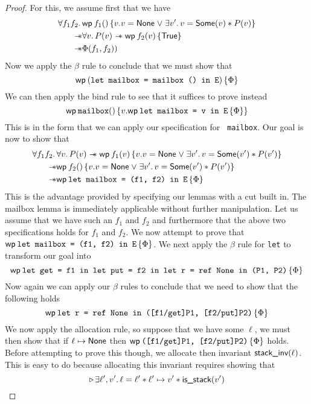 \begin{proof}
  For this, we assume first that we have
  \begin{align*}
    \All f_1 f_2.&
        \wpre{f_1()}{v. v = \textlog{None} \mathrel{\vee} \Exists v'. v = \textlog{Some}(v) * P(v)}\\
    \wand & \All v. P(v) \wand \wpre{f_2(v)}{\TRUE}\\
    \wand & \Phi(f_1, f_2))\\
  \end{align*}
  Now we apply the $\beta$ rule to conclude that we must show that
  \[
    \wpre{(\text{\tt let mailbox = mailbox () in E})}{\Phi}
  \]
  We can then apply the bind rule to see that it suffices to prove
  instead
  \[
    \wpre{\mathtt{mailbox()}}{v. \wpre{\text{\tt let mailbox = v in E}}{\Phi}}
  \]
  This is in the form that we can apply our specification for {\tt
    mailbox}. Our goal is now to show that
  \begin{align*}
    \All f_1 f_2.&
    \All v. P(v) \wand \wpre{f_1(v)}{v. v = \textlog{None} \mathrel{\vee} \Exists v'. v = \textlog{Some}(v') * P(v')}\\
    \wand & \wpre{f_2()}{v. v = \textlog{None} \mathrel{\vee} \Exists v'. v = \textlog{Some}(v') * P(v')}\\
    \wand & \wpre{\text{\tt let mailbox = (f1, f2) in E}}{\Phi}
  \end{align*}
  This is the advantage provided by specifying our lemmas with a cut
  built in. The mailbox lemma is immediately applicable without
  further manipulation. Let us assume that we have such an $f_1$ and
  $f_2$ and furthermore that the above two specifications holds for
  $f_1$ and $f_2$. We now attempt to prove that
  $\wpre{\text{\tt let mailbox = (f1, f2) in E}}{\Phi}$.  We next
  apply the $\beta$ rule for {\tt let} to transform our goal into
  \[
    \wpre{\text{\tt let get = f1 in let put = f2 in let r = ref None in (P1, P2)}}{\Phi}
  \]
  Now again we can apply our $\beta$ rules to conclude that we need to
  show that the following holds
  \[
    \wpre{\text{\tt let r = ref None in ([f1/get]P1, [f2/put]P2)}}{\Phi}
  \]
  We now apply the allocation rule, so suppose that we have some
  $\ell$, we must then show that if $\ell \mapsto \textsf{None}$ then
  $\wpre{\text{\tt ([f1/get]P1, [f2/put]P2)}}{\Phi}$ holds. Before
  attempting to prove this though, we allocate then invariant
  $\textsf{stack\_inv}(\ell)$. This is easy to do because allocating
  this invariant requires showing that
  \[
    \later \Exists \ell', v'. \ell = \ell' * \ell' \mapsto v' * \textlog{is\_stack}(v')
\]
\end{proof}
